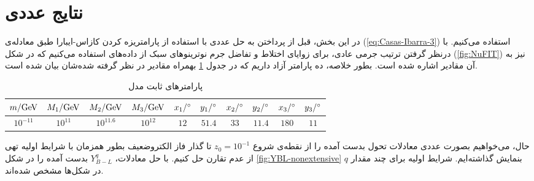 \documentclass[a4paper]{book}
\begin{document}
\section{نتایج عددی}
\label{sec:results-nonextensive}
در این بخش، قبل از پرداختن به حل عددی با استفاده از پارامتریزه کردن کازاس-ایبارا طبق معادله‌ی (\ref{eq:Casas-Ibarra-3}) استفاده می‌کنیم. با درنظر گرفتن ترتیب جرمی عادی، برای زوایای اختلاط و تفاضل جرم نوترینوهای سبک از داده‌های  استفاده می‌کنیم \cite{Esteban:2020cvm} که در شکل (\ref{fig:NuFIT}) نیز به آن مقادیر اشاره شده است.
بطور خلاصه، ده پارامتر آزاد داریم که در جدول \ref{tab:parameters-nonextensive} بهمراه مقادیر در نظر گرفته شده‌شان بیان شده است.
\begin{table}[!h]
	\centering
	\caption{پارامتر‌های ثابت مدل}
	\begin{latin}
		\footnotesize
		\begin{tabular}{c c c c c c c c c c}
			\hline
			$m/{\rm GeV}$ & $M_1/{\rm GeV}$ & $M_2/{\rm GeV}$	& $M_3/{\rm GeV}$ & $x_1/\degree$ & $y_1/\degree$ & $x_2/\degree$ & $y_2/\degree$ & $x_3/\degree$ &   $y_3/\degree$ \\
			\hline
			$10^{-11}$	& $10^{11}$ & $10^{11.6}$& $10^{12}$ & $12$ & $51.4$ & $33$ & $11.4$ & $180$ & $11$\\
			\hline
		\end{tabular}
	\end{latin}
	\label{tab:parameters-nonextensive}
\end{table}

حال، می‌خواهیم بصورت عددی معادلات تحول بدست آمده را از نقطه‌ی شروع {\footnotesize$z_0=10^{-1}$} تا گذار فاز الکتروضعیف بطور همزمان با شرایط اولیه تهی از عدم تقارن حل کنیم. با حل معادلات، {\footnotesize$Y_{B-L}^q$} بدست آمده را در شکل \ref{fig:YBL-nonextensive} بنمایش گذاشته‌ایم. شرایط اولیه برای چند مقدار {\footnotesize$q$} در شکل‌ها مشخص شده‌اند. 
\end{document}
